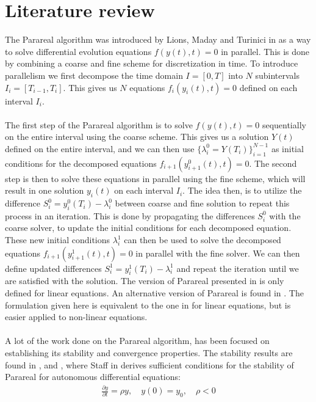 \chapter{Literature review} \label{lit_chap}
The Parareal algorithm was introduced by Lions, Maday and Turinici in \cite{lions2001resolution} as a way to solve differential evolution equations $f(y(t),t)=0$ in parallel. This is done by combining a coarse and fine scheme for discretization in time. To introduce parallelism we first decompose the time domain $I=[0,T]$ into $N$ subintervals $I_i=[T_{i-1},T_i]$. This gives us $N$ equations $f_i(y_i(t),t)=0$ defined on each interval $I_i$. 
\\
\\
The first step of the Parareal algorithm is to solve $f(y(t),t)=0$ sequentially on the entire interval using the coarse scheme. This gives us a solution $Y(t)$ defined on the entire interval, and we can then use $\{\lambda_i^0=Y(T_i)\}_{i=1}^{N-1}$ as initial conditions for the decomposed equations $f_{i+1}(y_{i+1}^0(t),t)=0$. The second step is then to solve these equations in parallel using the fine scheme, which will result in one solution $y_i(t)$ on each interval $I_i$. The idea then, is to utilize the difference $S_i^0=y_i^0(T_{i})-\lambda_i^0$ between coarse and fine solution to repeat this process in an iteration. This is done by propagating the differences $S_i^0$ with the coarse solver, to update the initial conditions for each decomposed equation. These new initial conditions $\lambda_i^1$ can then be used to solve the decomposed equations $f_{i+1}(y_{i+1}^1(t),t)=0$ in parallel with the fine solver. We can then define updated differences $S_i^1=y_i^1(T_{i})-\lambda_i^1$ and repeat the iteration until we are satisfied with the solution. The version of Parareal presented in \cite{lions2001resolution} is only defined for linear equations. An alternative version of Parareal is found in \cite{baffico2002parallel}. The formulation given here is equivalent to the one in \cite{lions2001resolution} for linear equations, but is easier applied to non-linear equations.
\\
\\
A lot of the work done on the Parareal algorithm, has been focused on establishing its stability and convergence properties. The stability results are found in \cite{staff2005stability},\cite{maday2007parareal} and \cite{bal2005convergence}, where Staff in \cite{staff2005stability} derives sufficient conditions for the stability of Parareal for autonomous differential equations:
\begin{align}
\frac{\partial y}{\partial t} =\rho y,\quad y(0)=y_0,\quad  \rho<0 \label{autonom E}
\end{align}
